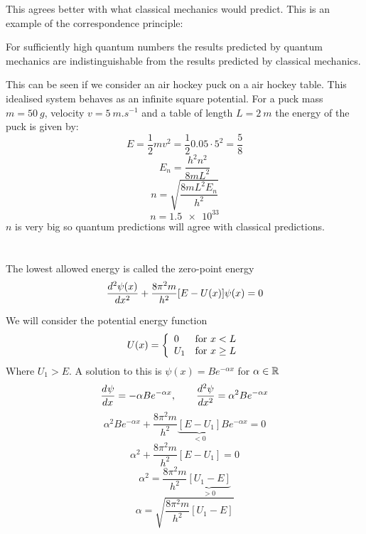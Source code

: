 \begin{center}
\end{center}
This agrees better with what classical mechanics would predict. This is an example of the correspondence principle:

\begin{displayquote}
For sufficiently high quantum numbers the results predicted by quantum mechanics are indistinguishable from the results predicted by classical mechanics.
\end{displayquote}

This can be seen if we consider an air hockey puck on a air hockey table. This idealised system behaves as an infinite square potential. For a puck mass \(m=\SI{50}{g}\), velocity \(v=\SI{5}{m.s^{-1}}\) and a table of length \(L=\SI{2}{m}\) the energy of the puck is given by:
\[E=\frac 12mv^2=\frac 120.05\cdot 5^2=\frac 58\]
\[E_n=\frac{h^2n^2}{8mL^2}\]
\[n=\sqrt{\frac{8mL^2E_n}{h^2}}\]
\[n=\num{1.5e33}\]
\(n\) is very big so quantum predictions will agree with classical predictions.

\section{}

The lowest allowed energy is called the zero-point energy
\[\dv[2]{\psi(x)}{x} + \frac{8\pi^2m}{h^2}[E-U(x)]\psi(x)=0\]

We will consider the potential energy function
\[U(x)=\left\{
\begin{array}{l l}
0 & \text{for } x<L\\
U_1 & \text{for } x\ge L
\end{array}
\right.\]
Where \(U_1>E\). A solution to this is \(\psi(x)=Be^{-\alpha x}\) for \(\alpha\in\bb R\)
\[\dv{\psi}{x}=-\alpha Be^{-\alpha x},\qquad \dv[2]{\psi}{x}=\alpha^2Be^{-\alpha x}\]
\[\alpha^2 B e^{-\alpha x}+\frac{8\pi^2m}{h^2}\underbrace{[E-U_1]}_{<0}Be^{-\alpha x}=0\]
\[\alpha^2 +\frac{8\pi^2m}{h^2}[E-U_1]=0\]
\[\alpha^2=\frac{8\pi^2m}{h^2}\underbrace{[U_1-E]}_{>0}\]
\[\alpha = \sqrt{\frac{8\pi^2m}{h^2}[U_1-E]}\]

